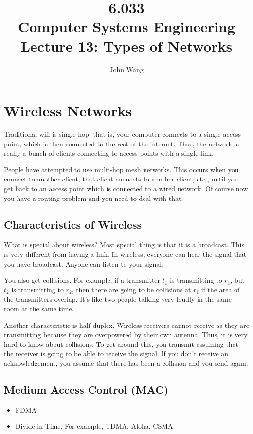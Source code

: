 \documentclass[psamsfonts]{amsart}
\title{6.033 \\
Computer Systems Engineering \\
Lecture 13: Types of Networks}
\author{John Wang}
\begin{document}
\maketitle

\section{Wireless Networks}

Traditional wifi is single hop, that is, your computer connects to a single access point, which is then connected to the rest of the internet. Thus, the network is really a bunch of clients connecting to access points with a single link.

People have attempted to use multi-hop mesh networks. This occurs when you connect to another client, that client connects to another client, etc., until you get back to an access point which is connected to a wired network. Of course now you have a routing problem and you need to deal with that.

\subsection{Characteristics of Wireless}

What is special about wireless? Most special thing is that it is a broadcast. This is very different from having a link. In wireless, everyone can hear the signal that you have broadcast. Anyone can listen to your signal.

You also get collisions. For example, if a transmitter $t_1$ is transmitting to $r_1$, but $t_2$ is transmitting to $r_2$, then there are going to be collisions at $r_1$ if the area of the transmitters overlap. It's like two people talking very loudly in the same room at the same time.

Another characteristic is half duplex. Wireless receivers cannot receive as they are transmitting because they are overpowered by their own antenna. Thus, it is very hard to know about collisions. To get around this, you transmit assuming that the receiver is going to be able to receive the signal. If you don't receive an acknowledgement, you assume that there has been a collision and you send again.

\subsection{Medium Access Control (MAC)}

\begin{itemize}
  \item FDMA
  \item Divide in Time. For example, TDMA, Aloha, CSMA.
\end{itemize}
\end{document}
